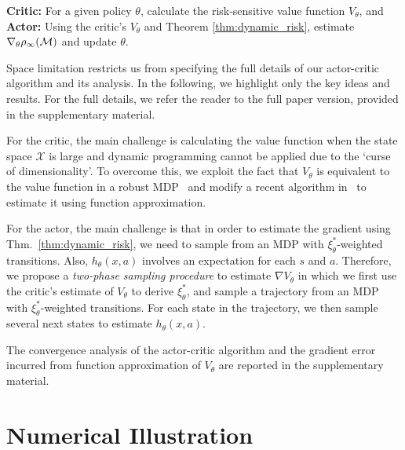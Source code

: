 \documentclass{article} %
\newcommand{\citet}{\cite}
\begin{document}
\textbf{Critic:} For a given policy $\theta$, calculate the risk-sensitive value function $V_\theta$, and \\
\textbf{Actor:} Using the critic's $V_\theta$ and Theorem \ref{thm:dynamic_risk}, estimate $\nabla_{\theta} \rho_\infty(\mathcal{M})$ and update $\theta$.

Space limitation restricts us from specifying the full details of our actor-critic algorithm and its analysis. In the following, we highlight only the key ideas and results. For the full details, we refer the reader to the full paper version, provided in the supplementary material.

For the critic, the main challenge is calculating the value function when the state space $\mathcal X$ is large and dynamic programming cannot be applied due to the `curse of dimensionality'. To overcome this, we exploit the fact that $V_\theta$ is equivalent to the value function in a robust MDP~\cite{osogami2012robustness} and modify a recent algorithm in~\citet{tamar2014robust} to estimate it using function approximation.

For the actor, the main challenge is that in order to estimate the gradient using Thm.~\ref{thm:dynamic_risk}, we need to sample from an MDP with $\xi_{\theta}^*$-weighted transitions. Also, $h_\theta(x,a)$ involves an expectation for each $s$ and $a$. Therefore, we propose a \emph{two-phase sampling procedure} to estimate $\nabla V_\theta$ in which we first use the critic's estimate of $V_\theta$ to derive $\xi_{\theta}^*$, and sample a trajectory from an MDP with $\xi_{\theta}^*$-weighted transitions. For each state in the trajectory, we then sample several next states to estimate $h_\theta(x,a)$.

The convergence analysis of the actor-critic algorithm and the gradient error incurred from function approximation of $V_\theta$ are reported in the supplementary material.


\section{Numerical Illustration}\label{sec:experiment}
\vspace{-0.1in}
\end{document}
